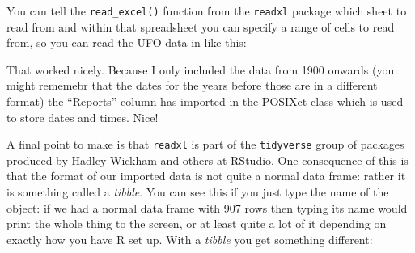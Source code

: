 \documentclass[
]{book}
\newenvironment{Shaded}{\begin{snugshade}}{\end{snugshade}}
\newcommand{\DataTypeTok}[1]{\textcolor[rgb]{0.13,0.29,0.53}{#1}}
\newcommand{\DecValTok}[1]{\textcolor[rgb]{0.00,0.00,0.81}{#1}}
\newcommand{\KeywordTok}[1]{\textcolor[rgb]{0.13,0.29,0.53}{\textbf{#1}}}
\newcommand{\NormalTok}[1]{#1}
\newcommand{\OperatorTok}[1]{\textcolor[rgb]{0.81,0.36,0.00}{\textbf{#1}}}
\newcommand{\StringTok}[1]{\textcolor[rgb]{0.31,0.60,0.02}{#1}}
\begin{document}
You can tell the \texttt{read\_excel()} function from the \texttt{readxl} package which sheet to read from and within that spreadsheet you can specify a range of cells to read from, so you can read the UFO data in like this:

\begin{Shaded}
\end{Shaded}

That worked nicely. Because I only included the data from 1900 onwards (you might rememebr that the dates for the years before those are in a different format) the ``Reports'' column has imported in the POSIXct class which is used to store dates and times. Nice!

A final point to make is that \texttt{readxl} is part of the \texttt{tidyverse} group of packages produced by Hadley Wickham and others at RStudio. One consequence of this is that the format of our imported data is not quite a normal data frame: rather it is something called a \emph{tibble}. You can see this if you just type the name of the object: if we had a normal data frame with 907 rows then typing its name would print the whole thing to the screen, or at least quite a lot of it depending on exactly how you have R set up. With a \emph{tibble} you get something different:
\end{document}
